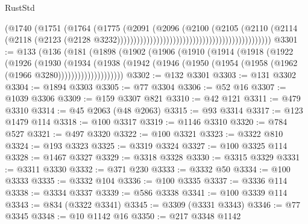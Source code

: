\begin{lexlean}{RustStd}
\begin{coremodule}
                                                                        (@1740
                                                                          (@1751
                                                                            (@1764
                                                                              (@1775
                                                                                (@2091
                                                                                  (@2096
                                                                                    (@2100
                                                                                      (@2105
                                                                                        (@2110
                                                                                          (@2114
                                                                                            (@2118
                                                                                              (@2123
                                                                                                (@2128
                                                                                                  @3232)))))))))))))))))))))))))))))))))))))))))))))))
@3301 := @133
    (@136
      (@181
        (@1898
          (@1902
            (@1906
              (@1910
                (@1914
                  (@1918
                    (@1922
                      (@1926
                        (@1930
                          (@1934
                            (@1938
                              (@1942
                                (@1946 (@1950 (@1954 (@1958 (@1962 (@1966 @3280))))))))))))))))))))
@3302 := @132 @3301
@3303 := @131 @3302
@3304 := @1894 @3303
@3305 := @77 @3304
@3306 := @52 @16
@3307 := @1039 @3306
@3309 := @159 @3307 @821
@3310 := @42 @121
@3311 := @479 @3310
@3314 := @45 @2063 (@48 @2063)
@3315 := @93 @3314
@3317 := @123 @1479 @114
@3318 := @100 @3317
@3319 := @1146 @3310
@3320 := @784 @527
@3321 := @497 @3320
@3322 := @100 @3321
@3323 := @3322 @810
@3324 := @193 @3323
@3325 := @3319 @3324
@3327 := @100 @3325 @114
@3328 := @1467 @3327
@3329 := @3318 @3328
@3330 := @3315 @3329
@3331 := @3311 @3330
@3332 := @371 @230
@3333 := @3332 @50
@3334 := @100 @3333
@3335 := @3332 @104
@3336 := @100 @3335
@3337 := @3336 @114
@3338 := @3334 @3337
@3339 := @586 @3338
@3341 := @100 @3339 @114
@3343 := @834 (@3322 @3341)
@3345 := @3309 (@3331 @3343)
@3346 := @77 @3345
@3348 := @10 @1142 @16
@3350 := @217 @3348 @1142

\end{coremodule}
\end{lexlean}

